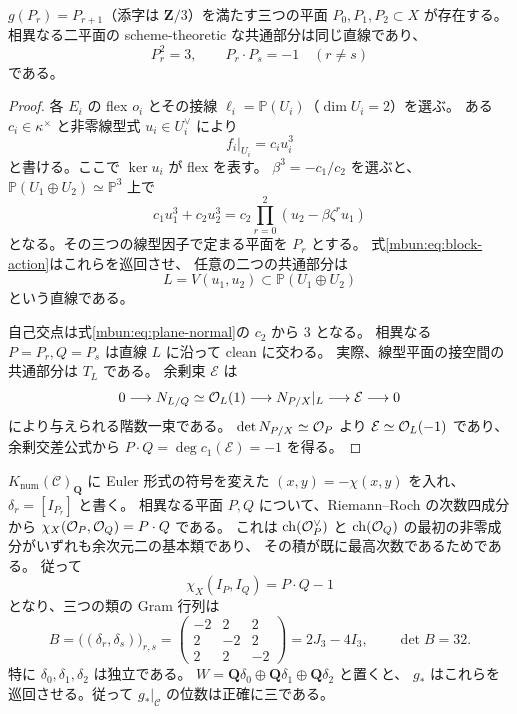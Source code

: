 \begin{lemma}
\label{mbun:lem:three-planes}
$g(P_r)=P_{r+1}$（添字は $\mathbf Z/3$）を満たす三つの平面
$P_0,P_1,P_2\subset X$ が存在する。
相異なる二平面の scheme-theoretic な共通部分は同じ直線であり、
\begin{equation}\label{mbun:eq:plane-intersections}
 P_r^2=3,\qquad P_r\cdot P_s=-1\quad(r\ne s)
\end{equation}
である。
\end{lemma}
\begin{proof}
各 $E_i$ の flex $o_i$ とその接線
$\ell_i=\mathbb P(U_i)$（$\dim U_i=2$）を選ぶ。
ある $c_i\in\kappa^\times$ と非零線型式 $u_i\in U_i^\vee$ により
\[
 f_i|_{U_i}=c_i u_i^3
\]
と書ける。ここで $\ker u_i$ が flex を表す。
$\beta^3=-c_1/c_2$ を選ぶと、$\mathbb P(U_1\oplus U_2)\simeq\mathbb P^3$ 上で
\[
 c_1u_1^3+c_2u_2^3
   =c_2\prod_{r=0}^2(u_2-\beta\zeta^r u_1)
\]
となる。その三つの線型因子で定まる平面を $P_r$ とする。
式\eqref{mbun:eq:block-action}はこれらを巡回させ、
任意の二つの共通部分は
\[
 L=V(u_1,u_2)\subset\mathbb P(U_1\oplus U_2)
\]
という直線である。

自己交点は式\eqref{mbun:eq:plane-normal}の $c_2$ から $3$ となる。
相異なる $P=P_r,Q=P_s$ は直線 $L$ に沿って clean に交わる。
実際、線型平面の接空間の共通部分は $T_L$ である。
余剰束 $\mathcal E$ は
\[
 0\longrightarrow N_{L/Q}\simeq\mathcal O_L(1)
       \longrightarrow N_{P/X}|_L\longrightarrow\mathcal E\longrightarrow0
\]
により与えられる階数一束である。
$\det N_{P/X}\simeq\mathcal O_P$ より $\mathcal E\simeq\mathcal O_L(-1)$ であり、
余剰交差公式から $P\cdot Q=\deg c_1(\mathcal E)=-1$ を得る。
\end{proof}

$K_{\mathrm{num}}(\mathcal C)_\mathbf Q$ に Euler 形式の符号を変えた
$(x,y)=-\chi(x,y)$ を入れ、
$\delta_r=[I_{P_r}]$ と書く。
相異なる平面 $P,Q$ について、Riemann--Roch の次数四成分から
$\chi_X(\mathcal O_P,\mathcal O_Q)=P\cdot Q$ である。
これは $\operatorname{ch}(\mathcal O_P^\vee)$ と
$\operatorname{ch}(\mathcal O_Q)$ の最初の非零成分がいずれも余次元二の基本類であり、
その積が既に最高次数であるためである。
従って
\[
 \chi_X(I_P,I_Q)=P\cdot Q-1
\]
となり、三つの類の Gram 行列は
\begin{equation}\label{mbun:eq:gram}
 B=\bigl((\delta_r,\delta_s)\bigr)_{r,s}
  =\begin{pmatrix}
    -2&2&2\\2&-2&2\\2&2&-2
   \end{pmatrix}
  =2J_3-4I_3,\qquad \det B=32 .
\end{equation}
特に $\delta_0,\delta_1,\delta_2$ は独立である。
$W=\mathbf Q\delta_0\oplus\mathbf Q\delta_1\oplus\mathbf Q\delta_2$ と置くと、
$g_*$ はこれらを巡回させる。従って $g_*|_{\mathcal C}$ の位数は正確に三である。

